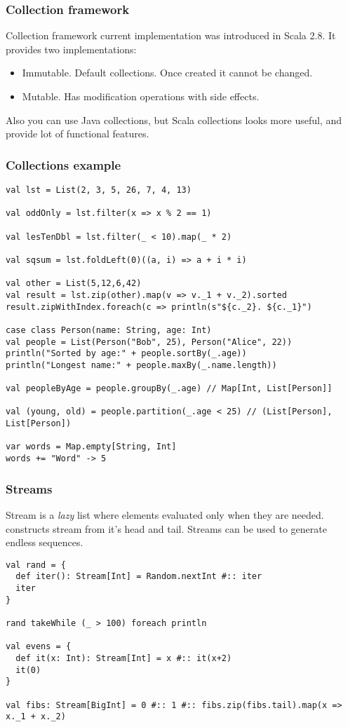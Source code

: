 \begin{frame}[fragile]
\frametitle{Collection framework}
Collection framework current implementation was introduced in Scala 2.8.  It provides two implementations:

\begin{itemize}
\item Immutable.  Default collections.  Once created it cannot be changed.
\item Mutable.  Has modification operations with side effects.
\end{itemize}

Also you can use Java collections, but Scala collections looks more useful, and provide lot of functional features.
\end{frame}

\begin{frame}[fragile]
\frametitle{Collections example}
\begin{lstlisting}
val lst = List(2, 3, 5, 26, 7, 4, 13)

val oddOnly = lst.filter(x => x % 2 == 1)

val lesTenDbl = lst.filter(_ < 10).map(_ * 2)

val sqsum = lst.foldLeft(0)((a, i) => a + i * i)

val other = List(5,12,6,42)
val result = lst.zip(other).map(v => v._1 + v._2).sorted
result.zipWithIndex.foreach(c => println(s"${c._2}. ${c._1}")

case class Person(name: String, age: Int)
val people = List(Person("Bob", 25), Person("Alice", 22))
println("Sorted by age:" + people.sortBy(_.age))
println("Longest name:" + people.maxBy(_.name.length))

val peopleByAge = people.groupBy(_.age) // Map[Int, List[Person]]

val (young, old) = people.partition(_.age < 25) // (List[Person], List[Person])

var words = Map.empty[String, Int]
words += "Word" -> 5
\end{lstlisting}
\end{frame}

\begin{frame}[fragile]
\frametitle{Streams}
Stream is a \emph{lazy} list where elements evaluated only when they are needed. \linline{#::} constructs stream
from it's head and tail.  Streams can be used to generate endless sequences.

\begin{lstlisting}
val rand = {
  def iter(): Stream[Int] = Random.nextInt #:: iter
  iter
}

rand takeWhile (_ > 100) foreach println

val evens = {
  def it(x: Int): Stream[Int] = x #:: it(x+2)
  it(0)
}

val fibs: Stream[BigInt] = 0 #:: 1 #:: fibs.zip(fibs.tail).map(x => x._1 + x._2)
\end{lstlisting}

\end{frame}

